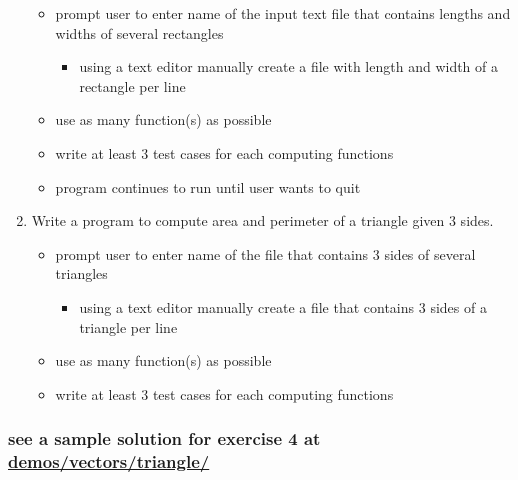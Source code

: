 \documentclass[11pt]{article}
\providecommand{\tightlist}{%
      \setlength{\itemsep}{0pt}\setlength{\parskip}{0pt}}
\begin{document}
\begin{enumerate}
  \begin{itemize}
  \tightlist
  \item
    prompt user to enter name of the input text file that contains
    lengths and widths of several rectangles

    \begin{itemize}
    \tightlist
    \item
      using a text editor manually create a file with length and width
      of a rectangle per line
    \end{itemize}
  \item
    use as many function(s) as possible
  \item
    write at least 3 test cases for each computing functions
  \item
    program continues to run until user wants to quit
  \end{itemize}
\item
  Write a program to compute area and perimeter of a triangle given 3
  sides.

  \begin{itemize}
  \tightlist
  \item
    prompt user to enter name of the file that contains 3 sides of
    several triangles

    \begin{itemize}
    \tightlist
    \item
      using a text editor manually create a file that contains 3 sides
      of a triangle per line
    \end{itemize}
  \item
    use as many function(s) as possible
  \item
    write at least 3 test cases for each computing functions
  \end{itemize}
\end{enumerate}

\hypertarget{see-a-sample-solution-for-exercise-4-at-demosvectorstriangle}{%
\subsubsection{\texorpdfstring{see a sample solution for exercise 4 at
\url{demos/vectors/triangle/}}{see a sample solution for exercise 4 at demos/vectors/triangle/}}\label{see-a-sample-solution-for-exercise-4-at-demosvectorstriangle}}
\end{document}
